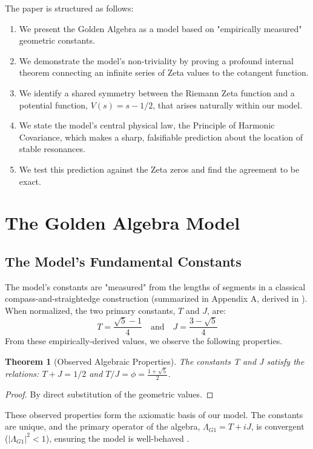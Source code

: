 \documentclass{article}
\theoremstyle{plain}
\newtheorem{theorem}{Theorem}[section]
\theoremstyle{definition}
\theoremstyle{remark}
\begin{document}
The paper is structured as follows:
\begin{enumerate}
    \item We present the Golden Algebra as a model based on "empirically measured" geometric constants.
    \item We demonstrate the model's non-triviality by proving a profound internal theorem connecting an infinite series of Zeta values to the cotangent function.
    \item We identify a shared symmetry between the Riemann Zeta function and a potential function, $V(s) = s-1/2$, that arises naturally within our model.
    \item We state the model's central physical law, the Principle of Harmonic Covariance, which makes a sharp, falsifiable prediction about the location of stable resonances.
    \item We test this prediction against the Zeta zeros and find the agreement to be exact.
\end{enumerate}

\section{The Golden Algebra Model}
\subsection{The Model's Fundamental Constants}
The model's constants are "measured" from the lengths of segments in a classical compass-and-straightedge construction (summarized in Appendix A, derived in \cite{HarrManuscripts}). When normalized, the two primary constants, $T$ and $J$, are:
$$ T = \frac{\sqrt{5}-1}{4} \quad \text{and} \quad J = \frac{3-\sqrt{5}}{4} $$
From these empirically-derived values, we observe the following properties.

\begin{theorem}[Observed Algebraic Properties]
The constants T and J satisfy the relations: $T+J = 1/2$ and $T/J = \phi = \frac{1+\sqrt{5}}{2}$.
\end{theorem}
\begin{proof}
By direct substitution of the geometric values.
\end{proof}

These observed properties form the axiomatic basis of our model. The constants are unique, and the primary operator of the algebra, $\Lambda_{G1} = T+iJ$, is convergent ($|\Lambda_{G1}|^2 < 1$), ensuring the model is well-behaved \cite{HarrCompendium}.
\end{document}

